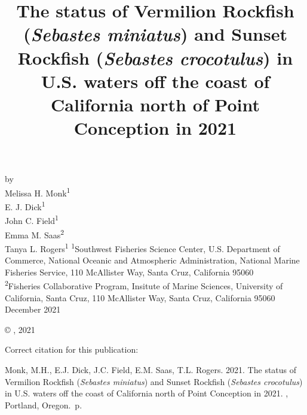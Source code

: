\documentclass[11pt,
  english,
]{article}
\date{}
\newcommand{\trTitle}{The status of Vermilion Rockfish (\emph{Sebastes miniatus}) and Sunset Rockfish (\emph{Sebastes crocotulus}) in U.S. waters off the coast of California north of Point Conception in 2021}
\newcommand{\trYear}{2021}
\newcommand{\trMonth}{December}
\newcommand{\trAuthsBack}{Monk, M.H., E.J. Dick, J.C. Field, E.M. Saas, T.L. Rogers}
\newcommand{\trCitation}{
\begin{hangparas}{1em}{1}
\trAuthsBack{}. \trYear{}. \trTitle{}. \glsentrylong{pfmc}, Portland, Oregon. \pageref{LastPage}{}\,p.
\end{hangparas}}
\begin{document}

\renewcommand*{\thefootnote}{\fnsymbol{footnote}}

\small
\thispagestyle{empty}
\noindent
\begin{center}
\title{The status of Vermilion Rockfish (\emph{Sebastes miniatus}) and Sunset Rockfish (\emph{Sebastes crocotulus}) in U.S. waters off the coast of California north of Point Conception in 2021}
\vspace{1.5cm}
{\Large\textbf{}}
\vfill
by\\
Melissa H. Monk\textsuperscript{1}\\
E. J. Dick\textsuperscript{1}\\
John C. Field\textsuperscript{1}\\
Emma M. Saas\textsuperscript{2}\\
Tanya L. Rogers\textsuperscript{1}\vfill
\textsuperscript{1}Southwest Fisheries Science Center, U.S. Department of Commerce, National Oceanic and Atmospheric Administration, National Marine Fisheries Service, 110 McAllister Way, Santa Cruz, California 95060\\
\textsuperscript{2}Fisheries Collaborative Program, Insitute of Marine Sciences, University of California, Santa Cruz, 110 McAllister Way, Santa Cruz, California 95060\vfill
\trMonth{} \trYear{}
\end{center}
\clearpage

\thispagestyle{empty}
\vspace*{\fill}
\begin{center}
\copyright{} , \trYear{}\\
\end{center}
\par
\bigskip
\noindent
Correct citation for this publication:
\bigskip
\par
\trCitation{}
\clearpage


\tableofcontents\clearpage
\label{TRlastRoman}
\clearpage

\newpage
\thispagestyle{empty} %
\end{document}
